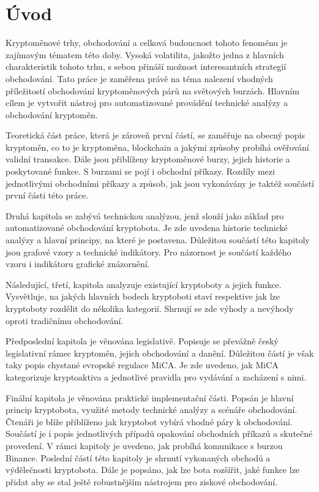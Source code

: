 \chapter{Úvod}
\label{sec:Introduction}
Kryptoměnové trhy, obchodování a celková budoucnost tohoto fenoménu je zajímavým tématem této doby. Vysoká volatilita, jakožto jedna z hlavních charakteristik tohoto trhu, s sebou přináší
možnost interesantních strategií obchodování. Tato práce je zaměřena právě na téma nalezení vhodných příležitostí obchodování kryptoměnových párů na světových burzách. Hlavním cílem
je vytvořit nástroj pro automatizované provádění technické analýzy a obchodování kryptoměn.

Teoretická část práce, která je zároveň první částí, se zaměřuje na obecný popis kryptoměn, co to je kryptoměna, blockchain a jakými způsoby probíhá ověřování validní transakce. Dále jsou
přiblíženy kryptoměnové burzy, jejich historie a poskytované funkce. S burzami se pojí i obchodní příkazy. Rozdíly mezi jednotlivými obchodními příkazy a způsob, jak jsou vykonávány je
taktéž součástí první části této práce.

Druhá kapitola se zabývá technickou analýzou, jenž slouží jako základ pro automatizované obchodování kryptobota. Je zde uvedena historie technické analýzy a hlavní principy,
na které je postavena. Důležitou součástí této kapitoly jsou grafové vzory a technické indikátory. Pro názornost je součástí každého vzoru i indikátoru grafické znázornění.

Následující, třetí, kapitola analyzuje existující kryptoboty a jejich funkce. Vysvětluje, na jakých hlavních bodech kryptoboti staví respektive jak lze kryptoboty rozdělit do několika
kategorií. Shrnují se zde výhody a nevýhody oproti tradičnímu obchodování.

Předposlední kapitola je věnována legislativě. Popisuje se převážně český legislativní rámec kryptoměn, jejich obchodování a danění. Důležitou částí je však taky popis chystané evropské
regulace MiCA. Je zde uvedeno, jak MiCA kategorizuje kryptoaktiva a jednotlivé pravidla pro vydávání a zacházení s nimi.

Finální kapitola je věnována praktické implementační části. Popsán je hlavní princip kryptobota, využité metody technické analýzy a scénáře obchodování. Čtenáři je blíže přiblíženo jak
kryptobot vybírá vhodné páry k obchodování. Součástí je i popis jednotlivých případů opakování obchodních příkazů a skutečné provedení. V rámci kapitoly je uvedeno, jak probíhá komunikace
s burzou Binance. Poslední částí této kapitoly je shrnutí vykonaných obchodů a výdělečnosti kryptobota. Dále je popsáno, jak lze bota rozšířit, jaké funkce lze přidat aby se stal ještě
robustnějším nástrojem pro ziskové obchodování.
\endinput